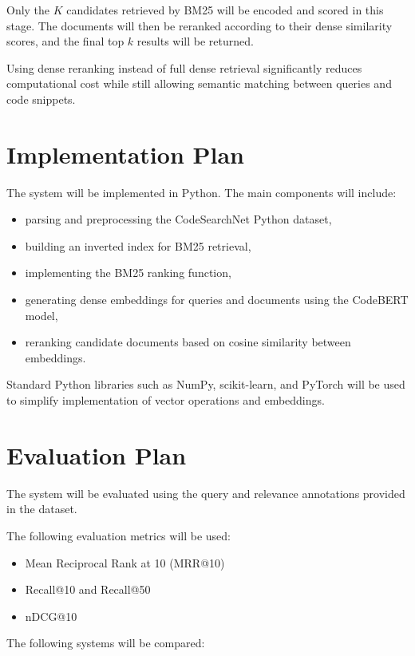 \documentclass[11pt,a4paper]{article}
\begin{document}
Only the $K$ candidates retrieved by BM25 will be encoded and scored in this stage. The documents will then be reranked according to their dense similarity scores, and the final top $k$ results will be returned.

Using dense reranking instead of full dense retrieval significantly reduces computational cost while still allowing semantic matching between queries and code snippets.

\section{Implementation Plan}

The system will be implemented in Python. The main components will include:

\begin{itemize}
    \item parsing and preprocessing the CodeSearchNet Python dataset,
    \item building an inverted index for BM25 retrieval,
    \item implementing the BM25 ranking function,
    \item generating dense embeddings for queries and documents using the CodeBERT model,
    \item reranking candidate documents based on cosine similarity between embeddings.
\end{itemize}

Standard Python libraries such as NumPy, scikit-learn, and PyTorch will be used to simplify implementation of vector operations and embeddings.

\section{Evaluation Plan}

The system will be evaluated using the query and relevance annotations provided in the dataset.

The following evaluation metrics will be used:

\begin{itemize}
    \item Mean Reciprocal Rank at 10 (MRR@10)
    \item Recall@10 and Recall@50
    \item nDCG@10
\end{itemize}

The following systems will be compared:
\end{document}
